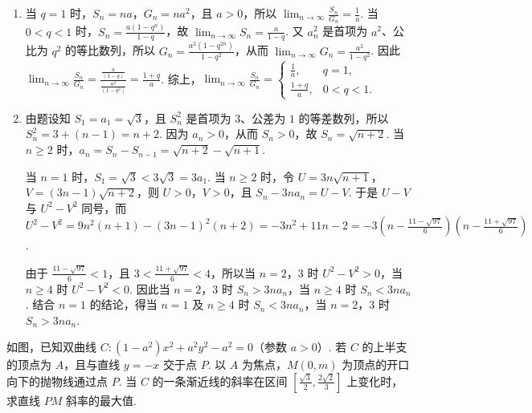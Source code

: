 \begin{solution}
\begin{enumerate}
\item 当 \(q=1\) 时，\(S_n=na\)，\(G_n=na^2\)，且 \(a>0\)，所以 \(\displaystyle\lim_{n\to\infty}\frac{S_n}{G_n}=\frac{1}{a}\). 当 \(0<q<1\) 时，\(S_n=\frac{a(1-q^n)}{1-q}\)，故 \(\displaystyle\lim_{n\to\infty}S_n=\frac{a}{1-q}\). 又 \(a_n^2\) 是首项为 \(a^2\)、公比为 \(q^2\) 的等比数列，所以 \(G_n=\frac{a^2(1-q^{2n})}{1-q^2}\)，从而 \(\displaystyle\lim_{n\to\infty}G_n=\frac{a^2}{1-q^2}\). 因此 \(\displaystyle\lim_{n\to\infty}\frac{S_n}{G_n}=\frac{\frac{a}{(1-q)}}{\frac{a^2}{(1-q^2)}}=\frac{1+q}{a}\). 综上，\(\displaystyle\lim_{n\to\infty}\frac{S_n}{G_n}=\begin{cases}
\frac{1}{a}, & q=1,\\
\frac{1+q}{a}, & 0<q<1.
\end{cases}\)

\item 由题设知 \(S_1=a_1=\sqrt{3}\)，且 \(S_n^2\) 是首项为 \(3\)、公差为 \(1\) 的等差数列，所以 \(S_n^2=3+(n-1)=n+2\). 因为 \(a_n>0\)，从而 \(S_n>0\)，故 \(S_n=\sqrt{n+2}\). 当 \(n\geqslant2\) 时，\(a_n=S_n-S_{n-1}=\sqrt{n+2}-\sqrt{n+1}\).

当 \(n=1\) 时，\(S_1=\sqrt{3}<3\sqrt{3}=3a_1\). 当 \(n\geqslant2\) 时，令 \(U=3n\sqrt{n+1}\)，\(V=(3n-1)\sqrt{n+2}\)，则 \(U>0\)，\(V>0\)，且 \(S_n-3na_n=U-V\). 于是 \(U-V\) 与 \(U^2-V^2\) 同号，而
\(U^2-V^2=9n^2(n+1)-(3n-1)^2(n+2)=-3n^2+11n-2=-3\left(n-\frac{11-\sqrt{97}}{6}\right)\left(n-\frac{11+\sqrt{97}}{6}\right)\).

由于 \(\frac{11-\sqrt{97}}{6}<1\)，且 \(3<\frac{11+\sqrt{97}}{6}<4\)，所以当 \(n=2\)，\(3\) 时 \(U^2-V^2>0\)，当 \(n\geqslant4\) 时 \(U^2-V^2<0\). 因此当 \(n=2\)，\(3\) 时 \(S_n>3na_n\)，当 \(n\geqslant4\) 时 \(S_n<3na_n\). 结合 \(n=1\) 的结论，得当 \(n=1\) 及 \(n\geqslant4\) 时 \(S_n<3na_n\)，当 \(n=2\)，\(3\) 时 \(S_n>3na_n\).
\end{enumerate}
\end{solution}

\begin{problem}
如图，已知双曲线 \(C: (1 - a^2)x^2 + a^2y^2 - a^2 = 0\)（参数 \(a > 0\)）. 若 \(C\) 的上半支的顶点为 \(A\)，且与直线 \(y = -x\) 交于点 \(P\). 以 \(A\) 为焦点，\(M(0,m)\) 为顶点的开口向下的抛物线通过点 \(P\). 当 \(C\) 的一条渐近线的斜率在区间 \(\left[\frac{\sqrt{3}}{2}, \frac{2\sqrt{2}}{3}\right]\) 上变化时，求直线 \(PM\) 斜率的最大值.

\end{problem}

